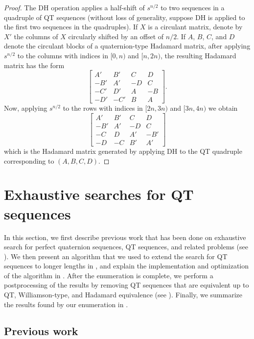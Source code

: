 \documentclass[12pt]{article}
\numberwithin{equation}{section}
\begin{document}
\begin{proof}
The DH operation applies a half-shift of $s^{n/2}$ to two sequences in a
quadruple of QT sequences (without loss of generality, suppose DH is applied
to the first two sequences in the quadruples).
If $X$ is a circulant matrix, denote by $X'$ the
columns of $X$ circularly shifted by an offset of $n/2$.  If $A$, $B$, $C$, and $D$ denote
the circulant blocks of a quaternion-type Hadamard matrix,
after applying $s^{n/2}$ to the columns with indices
in $[0,n)$ and $[n,2n)$, the resulting Hadamard matrix has
the form
\[ \begin{bmatrix}
A' & B' & C & D \\
-B' & A' & -D & C \\
-C' & D' & A & -B \\
-D' & -C' & B & A
\end{bmatrix} . \]
Now, applying $s^{n/2}$ to the rows with indices in $[2n,3n)$ and $[3n,4n)$ we obtain
\[ \begin{bmatrix}
A' & B' & C & D \\
-B' & A' & -D & C \\
-C & D & A' & -B' \\
-D & -C & B' & A'
\end{bmatrix} \]
which is the Hadamard matrix generated by applying DH to the QT quadruple corresponding
to $(A,B,C,D)$.
\end{proof}

\section{Exhaustive searches for QT sequences}\label{sec:search}

In this section, we first describe previous work that has been done on exhaustive search for perfect quaternion sequences, QT sequences, and related problems (see ).
We then present an algorithm that we used to extend the search for QT sequences to longer lengths in ,
and explain the implementation and optimization of the algorithm in .
After the enumeration is complete, we perform a postprocessing of the results by removing QT sequences
that are equivalent up to QT, Williamson-type, and Hadamard equivalence (see ).
Finally, we summarize the results found by our enumeration in .

\subsection{Previous work}\label{sec:prev_work}
\end{document}
